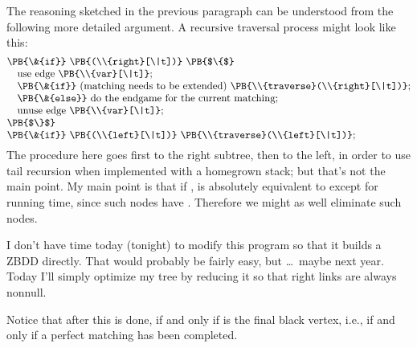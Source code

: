 The reasoning sketched in the previous paragraph can be understood from the
following more detailed argument. A recursive traversal process 
might look like this:
$$\vbox{\halign{#\hfil\cr
\PB{\&{if}} \PB{(\\{right}[\|t])} \PB{$\{$}\cr
\quad use edge \PB{\\{var}[\|t]};\cr
\quad \PB{\&{if}} (matching needs to be extended) \PB{\\{traverse}(\\{right}[%
\|t])};\cr
\quad \PB{\&{else}} do the endgame for the current matching;\cr
\quad unuse edge \PB{\\{var}[\|t]};\cr
\PB{$\}$}\cr
\PB{\&{if}} \PB{(\\{left}[\|t])} \PB{\\{traverse}(\\{left}[\|t])};\cr}}$$
The procedure here goes first to the right subtree, then to the left, in order
to use tail recursion when implemented with a homegrown stack; but that's not
the main point. My main point is that if ,  is
absolutely equivalent to  except for running
time, since
such nodes have . Therefore we might as well
eliminate such nodes.

I don't have time today (tonight) to modify this program so that it builds a
ZBDD directly. That would probably be fairly easy, but \dots\ maybe next year.
Today I'll simply optimize my tree by reducing it so that right links are
always nonnull.

Notice that after this is done,  if and only if %
 is
the final black vertex, i.e., if and only if a perfect matching has been
completed.

